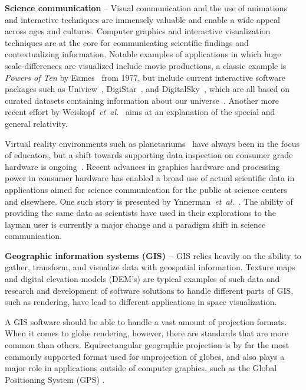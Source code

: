 \documentclass[journal]{vgtc}                %
\newcommand{\etal}{\emph{et~al.}}
\begin{document}
\noindent\textbf{Science communication} --
Visual communication and the use of animations and interactive techniques are immensely valuable and enable a wide appeal across ages and cultures.
Computer graphics and interactive visualization techniques are at the core for communicating scientific findings and contextualizing information.
Notable examples of applications in which huge scale-differences are visualized include movie productions, a classic example is \emph{Powers of Ten} by Eames~\cite{powersOfTen} from 1977, but include current interactive software packages such as Uniview~\cite{KHECY10}, DigiStar~\cite{ES16}, and DigitalSky~\cite{Sky16}, which are all based on curated datasets containing information about our universe~\cite{abbott2006digital}. 
Another more recent effort by Weiskopf~\etal~\cite{weiskopf2006explanatory} aims at an explanation of the special and general relativity.

Virtual reality environments such as planetariums~\cite{magnor2010progress, liu20013} have always been in the focus of educators, but a shift towards supporting data inspection on consumer grade hardware is ongoing~\cite{nakasone2009astrosim}.
Recent advances in graphics hardware and processing power in consumer hardware has enabled a broad use of actual scientific data in applications aimed for science communication for the public at science centers and elsewhere.
One such story is presented by Ynnerman~\etal~\cite{ynnerman2016interactive}.
The ability of providing the same data as scientists have used in their explorations to the layman user is currently a major change and a paradigm shift in science communication.



\textbf{Geographic information systems (GIS) -- } GIS relies heavily on the ability to gather, transform, and visualize data with geospatial information.
Texture maps and digital elevation models (DEM's) are typical examples of such data and research and development of software solutions to handle different parts of GIS, such as rendering, have lead to different applications in space visualization.

A GIS software should be able to handle a vast amount of projection formats. When it comes to globe rendering, however, there are standards that are more common than others.
Equirectangular geographic projection is by far the most commonly supported format used for unprojection of globes, and also plays a major role in applications outside of computer graphics, such as the Global Positioning System (GPS) \cite{cozzi20113d}.
\end{document}
